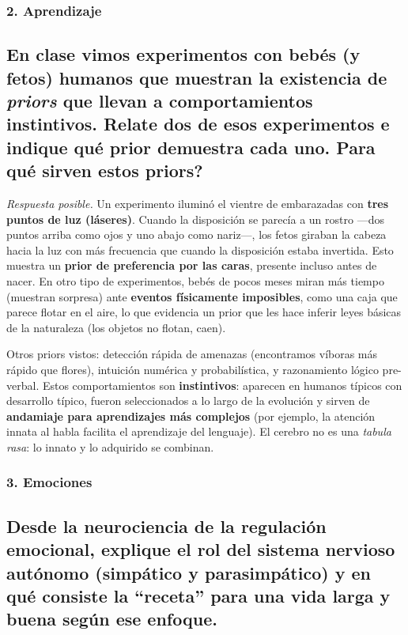 \documentclass[11pt, a4paper]{article}
\newcommand{\pregunta}[1]{\subsection{#1}}
\newcommand{\eje}[1]{\subsubsection{#1}}
\begin{document}
\eje{2. Aprendizaje}
\pregunta{En clase vimos experimentos con beb\'es (y fetos) humanos que muestran la existencia de \emph{priors} que llevan a comportamientos instintivos. Relate dos de esos experimentos e indique qu\'e prior demuestra cada uno. \textquestiondown Para qu\'e sirven estos priors?}

\begin{respuesta}
\textit{Respuesta posible.} Un experimento ilumin\'o el vientre de embarazadas con \textbf{tres puntos de luz (l\'aseres)}. Cuando la disposici\'on se parec\'ia a un rostro ---dos puntos arriba como ojos y uno abajo como nariz---, los fetos giraban la cabeza hacia la luz con m\'as frecuencia que cuando la disposici\'on estaba invertida. Esto muestra un \textbf{prior de preferencia por las caras}, presente incluso antes de nacer. En otro tipo de experimentos, beb\'es de pocos meses miran m\'as tiempo (muestran sorpresa) ante \textbf{eventos f\'isicamente imposibles}, como una caja que parece flotar en el aire, lo que evidencia un prior que les hace inferir leyes b\'asicas de la naturaleza (los objetos no flotan, caen).

Otros priors vistos: detecci\'on r\'apida de amenazas (encontramos v\'iboras m\'as r\'apido que flores), intuici\'on num\'erica y probabil\'istica, y razonamiento l\'ogico pre-verbal. Estos comportamientos son \textbf{instintivos}: aparecen en humanos t\'ipicos con desarrollo t\'ipico, fueron seleccionados a lo largo de la evoluci\'on y sirven de \textbf{andamiaje para aprendizajes m\'as complejos} (por ejemplo, la atenci\'on innata al habla facilita el aprendizaje del lenguaje). El cerebro no es una \emph{tabula rasa}: lo innato y lo adquirido se combinan.
\end{respuesta}

\eje{3. Emociones}
\pregunta{Desde la neurociencia de la regulaci\'on emocional, explique el rol del \textbf{sistema nervioso aut\'onomo} (simp\'atico y parasimp\'atico) y en qu\'e consiste la ``receta'' para una vida larga y buena seg\'un ese enfoque.}
\end{document}
